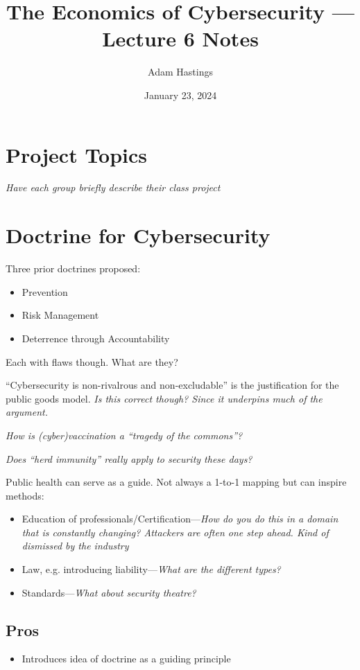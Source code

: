 \documentclass[11pt]{article}
\title{The Economics of Cybersecurity --- Lecture 6 Notes}
\date{January 23, 2024}
\author{Adam Hastings}
\begin{document}
\maketitle

\section*{Project Topics}

\textit{Have each group briefly describe their class project}

\section*{Doctrine for Cybersecurity}

Three prior doctrines proposed:
\begin{itemize}
    \item Prevention
    \item Risk Management 
    \item Deterrence through Accountability
\end{itemize}

Each with flaws though. What are they?

``Cybersecurity is non-rivalrous and non-excludable'' is the justification for the public goods model. {\it Is this correct though? Since it underpins much of the argument.}

{\it How is (cyber)vaccination a ``tragedy of the commons''?}

{\it Does ``herd immunity'' really apply to security these days?}

Public health can serve as a guide. Not always a 1-to-1 mapping but can inspire methods:
\begin{itemize}
    \item Education of professionals/Certification---{\it How do you do this in a domain that is constantly changing? Attackers are often one step ahead. Kind of dismissed by the industry}
    \item Law, e.g. introducing liability---{\it What are the different types?}
    \item Standards---{\it What about security theatre?}
\end{itemize}


\subsection{Pros}
\begin{itemize}
    \item Introduces idea of doctrine as a guiding principle
\end{itemize}
\end{document}
